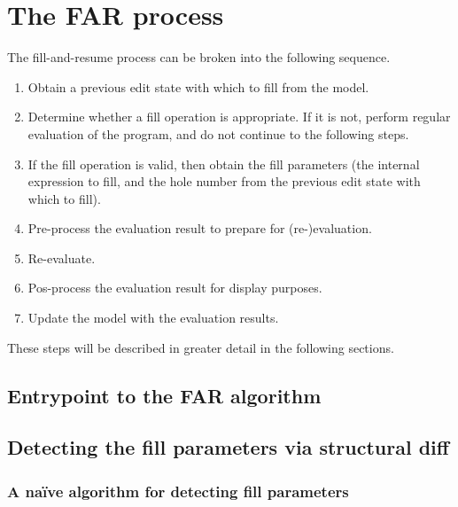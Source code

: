 \section{The FAR process}
\label{sec:far-process}

The fill-and-resume process can be broken into the following sequence.

\begin{enumerate}
\item Obtain a previous edit state with which to fill from the model.
\item Determine whether a fill operation is appropriate. If it is not, perform regular evaluation of the program, and do not continue to the following steps.
\item If the fill operation is valid, then obtain the fill parameters (the internal expression to fill, and the hole number from the previous edit state with which to fill).
\item Pre-process the evaluation result to prepare for (re-)evaluation.
\item Re-evaluate.
\item Pos-process the evaluation result for display purposes.
\item Update the model with the evaluation results.
\end{enumerate}

These steps will be described in greater detail in the following sections.

\subsection{Entrypoint to the FAR algorithm}
\label{sec:far-entrypoint}

\subsection{Detecting the fill parameters via structural diff}
\label{sec:obtaining-fill-parameters}

\subsubsection{A na\"ive algorithm for detecting fill parameters}
\label{sec:far-detect-naive}

